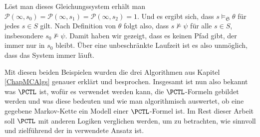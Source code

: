Löst man dieses Gleichungssystem erhält man $\mathcal{P}(\infty, s_0)=\mathcal{P}(\infty, s_1)=\mathcal{P}(\infty, s_2)=1$.
Und es ergibt sich, dass $s\models_\mathfrak{S} \theta$ für jedes $s\in S$ gilt.
Nach Definition von $\theta$ folgt also, dass $s\not\models \psi$ für alle $s\in S$, insbesondere $s_0\not\models \psi$.
Damit haben wir gezeigt, dass es keinen Pfad gibt, der immer nur in $s_0$ bleibt. 
Über eine unbeschränkte Laufzeit ist es also unmöglich, dass das System immer läuft.

Mit diesen beiden Beispielen wurden die drei Algorithmen aus Kapitel \ref{ChapMCAlgs} genauer erklärt und besprochen. 
Insgesamt ist nun also bekannt was $\PCTL$ ist, wofür es verwendet werden kann, die $\PCTL$-Formeln gebildet werden und was diese bedeuten und wie man algorithmisch auswertet, ob eine gegebene Markov-Kette ein Modell einer $\PCTL$-Formel ist. 
Im Rest dieser Arbeit soll $\PCTL$ mit anderen Logiken verglichen werden, um zu betrachten, wie sinnvoll und zielführend der in \cite{hansson1994logic} verwendete Ansatz ist.